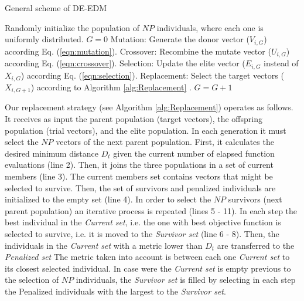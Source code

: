 \begin{algorithm}[t]
  \scriptsize
	\caption{General scheme of DE-EDM} 
	\begin{algorithmic}[1]
	\STATE Randomly initialize the population of $NP$ individuals, where each one is uniformly distributed.
	\STATE $G=0$
		\STATE Mutation: Generate the donor vector ($V_{i,G}$) according Eq. (\ref{eqn:mutation}).
		\STATE Crossover: Recombine the mutate vector ($U_{i,G}$) according Eq. (\ref{eqn:crossover}).
		\STATE Selection: Update the elite vector ($E_{i,G}$ instead of $X_{i,G}$) according Eq. (\ref{eqn:selection}).
		\STATE Replacement: Select the target vectors ($X_{i,G+1}$) according to Algorithm \ref{alg:Replacement} .
	   \ENDFOR
	   \STATE $G=G+1$
	\ENDWHILE
    \label{alg:DEEDM}
\end{algorithmic}
\end{algorithm}

%
%
%
%
%
%
%
%
%

Our replacement strategy (see Algorithm \ref{alg:Replacement}) operates as follows.
%
It receives as input the parent population (target vectors), the offspring population (trial vectors), and the elite population.
%
In each generation it must select the $NP$ vectors of the next parent population.
%
First, it calculates the desired minimum distance $D_t$ given the current number of elapsed function evaluations (line 2).
%
Then, it joins the three populations in a set of current members (line 3).
%
The current members set contains vectors that might be selected to survive.
%
Then, the set of survivors and penalized individuals are initialized to the empty set (line 4).
%
In order to select the $NP$ survivors (next parent population) an iterative process is repeated (lines 5 - 11).
%
In each step the best individual in the \textit{Current set}, i.e. the one with best objective function is selected
to survive, i.e. it is moved to the \textit{Survivor set} (line 6 - 8).
%
Then, the individuals in the \textit{Current set} with a \DCN{} metric lower than $D_t$ are transferred to the \textit{Penalized set}
%
The \DCN{} metric taken into account is between each one \textit{Current set} to its closest selected individual.
%
In case were the \textit{Current set} is empty previous to the selection of $NP$ individuals, the \textit{Survivor set} is filled by selecting in each step the Penalized individuals with the largest \DCN{} to the \textit{Survivor set}.



